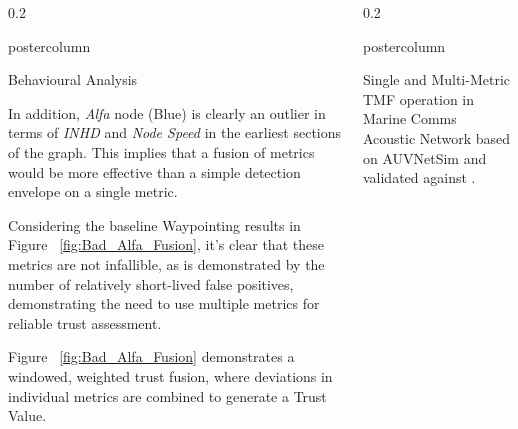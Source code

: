 \documentclass[final,hyperref={pdfpagelabels=false}]{beamer}
\def\colwidth{0.2\linewidth}
\begin{document}
\begin{frame}[fragile]
\begin{columns}[T]
\begin{column}{\colwidth}
\begin{beamercolorbox}[center,wd=\textwidth]{postercolumn}
\begin{minipage}[T]{.98\textwidth}
{\begin{block}{Behavioural Analysis}
							\vspace{0.3\baselineskip}
							
							In addition, \emph{Alfa} node (Blue) is clearly an outlier in terms of \emph{INHD} and \emph{Node Speed} in the earliest sections of the graph. This implies that a fusion of metrics would be more effective than a simple detection envelope on a single metric.
							
							
							Considering the baseline Waypointing results in Figure ~\ref{fig:Bad_Alfa_Fusion}, it's clear that these metrics are not infallible, as is demonstrated by the number of relatively short-lived false positives, demonstrating the need to use multiple metrics for reliable trust assessment.
							
							\vspace{0.3\baselineskip}
							
							Figure ~\ref{fig:Bad_Alfa_Fusion} demonstrates a windowed, weighted trust fusion, where deviations in individual metrics are combined to generate a Trust Value. 
						\end{block}
					}
				\end{minipage}
			\end{beamercolorbox}
		\end{column}
		
		\begin{column}{\colwidth}
			\begin{beamercolorbox}[center,wd=\textwidth]{postercolumn}
				\begin{minipage}[T]{.98\textwidth} %
					\parbox[t]{\textwidth}{ %
						\begin{block}{Single and Multi-Metric TMF operation in Marine Comms}
                Acoustic Network based on AUVNetSim \cite{Miquel2008} and validated against \cite{Stefanov2011}.

                \vspace{0.3\baselineskip}
							

\end{block}}
\end{minipage}
\end{beamercolorbox}
\end{column}
\end{columns}
\end{frame}
\end{document}
